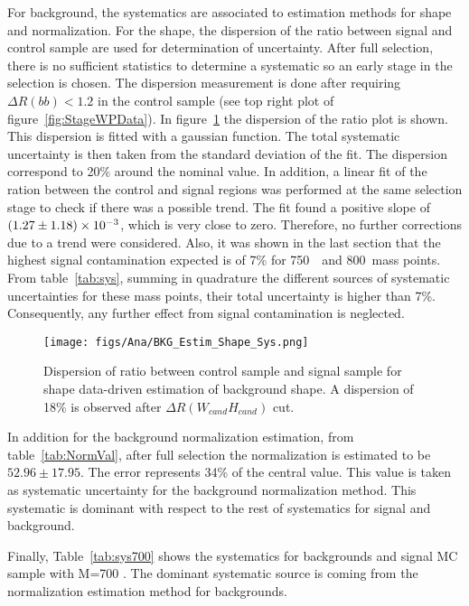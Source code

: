 For background, the systematics are associated to estimation methods for shape and normalization. For the shape, the dispersion of the ratio between signal and control sample are used for determination of uncertainty. After full selection, there is no sufficient statistics to determine a systematic so an early stage in the selection is chosen. The dispersion measurement is done after requiring $\Delta R(bb) <1.2$ in the control sample (see top right plot of figure~\ref{fig:StageWPData}). In figure~\ref{fig:ShapeSys} the dispersion of the ratio plot is shown. This dispersion is fitted with a gaussian function. The total systematic uncertainty is then taken from the standard deviation of the fit. The dispersion correspond to 20\% around the nominal value. In addition, a linear fit of the ration between the control and signal regions was performed at the same selection stage to check if there was a possible trend. The fit found a positive slope of $(1.27\pm1.18)\times 10^{-3}$, which is very close to zero. Therefore, no further corrections due to a trend were considered. Also, it was shown in the last section that the highest signal contamination expected is of 7\% for 750~\GeVcc~and 800~\GeVcc mass points. From table~\ref{tab:sys}, summing in quadrature the different sources of systematic uncertainties for these mass points, their total uncertainty is higher than 7\%. Consequently, any further effect from signal contamination is neglected.

\begin{figure}[!Hhtbp]
  \begin{center}
    \texttt{[image: figs/Ana/BKG\_Estim\_Shape\_Sys.png]}
    \caption{Dispersion of ratio between control sample and signal sample for shape data-driven estimation of background shape. A dispersion of 18\% is observed after $\Delta R (W_{cand} H_{cand})$ cut.}
    \label{fig:ShapeSys}
  \end{center}
\end{figure}

In addition for the background normalization estimation, from table~\ref{tab:NormVal}, after full selection the normalization is estimated to be $52.96\pm17.95$. The error represents 34\% of the central value. This value is taken as systematic uncertainty for the background normalization method. This systematic is dominant with respect to the rest of systematics for signal and background.

Finally, Table~\ref{tab:sys700} shows the systematics for backgrounds and signal MC sample with M=700 \GeVcc. The dominant systematic source is coming from the normalization estimation method for backgrounds.

